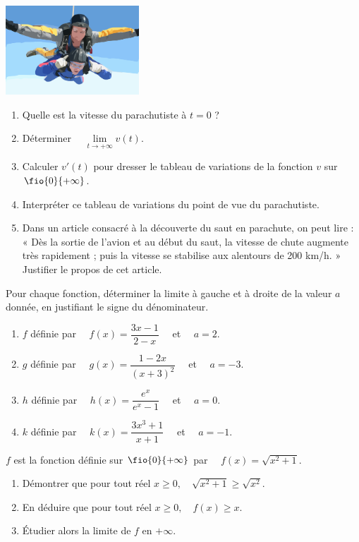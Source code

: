 \documentclass[a4paper,11pt,exos]{nsi} %
\begin{document}
{\includegraphics[width=5cm]{skydiving-297103_1280.png}}
\begin{enumerate}
	\item Quelle est la vitesse du parachutiste à $t=0$ ?
	\item Déterminer $\quad \lim\limits_{t\to +\infty}v(t)$.
	\item Calculer $v'(t)$ pour dresser le tableau de variations de la fonction $v$ sur $\fio{0}{+\infty}$.
	\item Interpréter ce tableau de variations du point de vue du parachutiste.
	\item Dans un article consacré à la découverte du saut en parachute, on peut lire : « Dès la sortie de l'avion et au début du saut, la vitesse de chute augmente très rapidement ; puis la vitesse se stabilise aux alentours de 200 km/h. »\\
	Justifier le propos de cet article.
\end{enumerate}


\exo{}
Pour chaque fonction, déterminer la limite à gauche et à droite de la valeur $a$ donnée, en justifiant le signe du dénominateur.
\begin{enumerate}
	\item $f$ définie par $\quad f(x)=\dfrac{3x-1}{2-x}\quad$ et $\quad a=2$.
	\item $g$ définie par $\quad g(x)=\dfrac{1-2x}{(x+3)^2}\quad$ et $\quad a=-3$.
	\item $h$ définie par $\quad h(x)=\dfrac{e^x}{e^x-1}\quad$ et $\quad a=0$.
	\item $k$ définie par $\quad k(x)=\dfrac{3x^3+1}{x+1}\quad$ et $\quad a=-1$.
\end{enumerate}

\exo{}
$f$ est la fonction définie sur $\fio{0}{+\infty}$ par $\quad f(x)=\sqrt{x^2+1}$.
\begin{enumerate}
	\item Démontrer que pour tout réel $x\geqslant 0, \quad \sqrt{x^2+1}\geqslant \sqrt{x^2}$.
	\item En déduire que pour tout réel $x\geqslant 0, \quad f(x)\geqslant x$.
	\item Étudier alors la limite de $f$ en $+\infty$.
\end{enumerate}
\end{document}
